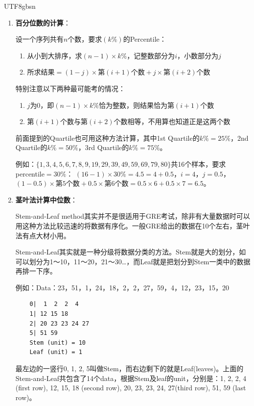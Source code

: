 \documentclass[12pt]{article}
\begin{document}
\begin{CJK*}{UTF8}{gbsn}
\begin{enumerate}
    因为3rd与1st的位置对称，可以将序列从大到小排（即倒过来排），再用1st的公式即可求得。
    
    \item \textbf{百分位数的计算}：
    
    设一个序列共有$n$个数，要求$(k\%)$的Percentile：
    \begin{enumerate}
        \item 从小到大排序，求$(n-1) \times k\%$，记整数部分为$i$，小数部分为$j$
        \item 所求结果$= (1-j) \times 第(i+1)个数 + j \times 第(i+2)个数$
    \end{enumerate}
    
    特别注意以下两种最可能考的情况：
    \begin{enumerate}
        \item $j$为0，即$(n-1) \times k\%$恰为整数，则结果恰为第$(i+1)$个数
        \item 第$(i+1)$个数与第$(i+2)$个数相等，不用算也知道正是这两个数
    \end{enumerate}
    
    前面提到的Quartile也可用这种方法计算，其中1st Quartile的$k\%=25\%$，2nd Quartile的$k\%=50\%$，3rd Quartile的$k\%=75\%$。
    
    例如：$\{1,3,4,5,6,7,8,9,19,29,39,49,59,69,79,80\}$共16个样本，要求percentile$=30\%$：
    $(16-1) \times 30\% = 4.5 = 4 + 0.5$，$i=4$，$j=0.5$，$(1-0.5) \times 第5个数 + 0.5 \times 第6个数 = 0.5 \times 6 + 0.5 \times 7 = 6.5$。
    
    \item \textbf{茎叶法计算中位数}：
    
    Stem-and-Leaf method其实并不是很适用于GRE考试，除非有大量数据时可以用这种方法比较迅速的将数据有序化。一般GRE给出的数据在10个左右，茎叶法有点大材小用。
    
    Stem-and-Leaf其实就是一种分级将数据分类的方法。Stem就是大的划分，如可以划分为1～10，11～20，21～30…，而Leaf就是把划分到Stem一类中的数据再排一下序。
    
    例如：Data：23，51，1，24，18，2，2，27，59，4，12，23，15，20
    \begin{verbatim}
    0|  1  2  2  4 
    1| 12 15 18 
    2| 20 23 23 24 27 
    5| 51 59 
    Stem (unit) = 10 
    Leaf (unit) = 1
    \end{verbatim}
    
    最左边的一竖行0, 1, 2, 5叫做Stem，而右边剩下的就是Leaf(leaves)。上面的Stem-and-Leaf共包含了14个data，根据Stem及leaf的unit，分别是：1, 2, 2, 4 (first row), 12, 15, 18 (second row), 20, 23, 23, 24, 27(third row), 51, 59 (last row)。
    

\end{enumerate}
\end{CJK*}
\end{document}
